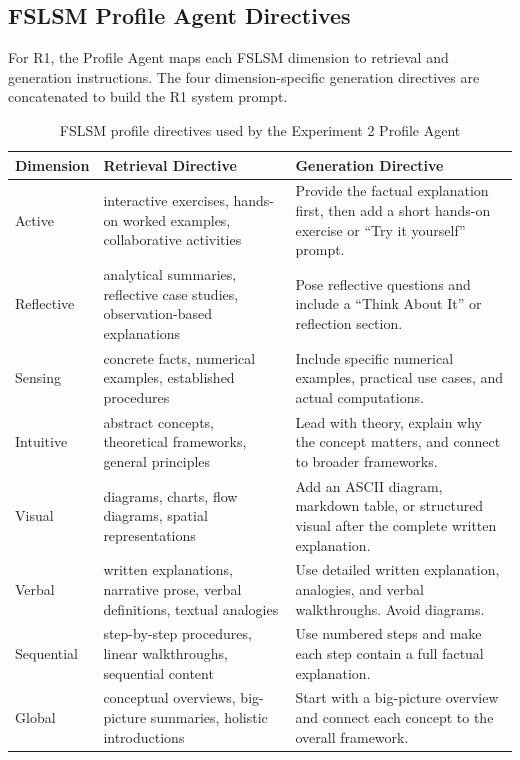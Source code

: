 \subsection{FSLSM Profile Agent Directives}
For R1, the Profile Agent maps each FSLSM dimension to retrieval and generation instructions. The four dimension-specific generation directives are concatenated to build the R1 system prompt.
\begin{table}[h]
    \centering
    \begin{tabular}{|p{3cm}|p{5cm}|p{6cm}|}
        \hline
        \textbf{Dimension} & \textbf{Retrieval Directive} & \textbf{Generation Directive} \\
        \hline
        Active & interactive exercises, hands-on worked examples, collaborative activities & Provide the factual explanation first, then add a short hands-on exercise or ``Try it yourself'' prompt. \\
        \hline
        Reflective & analytical summaries, reflective case studies, observation-based explanations & Pose reflective questions and include a ``Think About It'' or reflection section. \\
        \hline
        Sensing & concrete facts, numerical examples, established procedures & Include specific numerical examples, practical use cases, and actual computations. \\
        \hline
        Intuitive & abstract concepts, theoretical frameworks, general principles & Lead with theory, explain why the concept matters, and connect to broader frameworks. \\
        \hline
        Visual & diagrams, charts, flow diagrams, spatial representations & Add an ASCII diagram, markdown table, or structured visual after the complete written explanation. \\
        \hline
        Verbal & written explanations, narrative prose, verbal definitions, textual analogies & Use detailed written explanation, analogies, and verbal walkthroughs. Avoid diagrams. \\
        \hline
        Sequential & step-by-step procedures, linear walkthroughs, sequential content & Use numbered steps and make each step contain a full factual explanation. \\
        \hline
        Global & conceptual overviews, big-picture summaries, holistic introductions & Start with a big-picture overview and connect each concept to the overall framework. \\
        \hline
    \end{tabular}
    \caption{FSLSM profile directives used by the Experiment 2 Profile Agent}
    \label{tab:fslsm-profile-directives}
\end{table}

